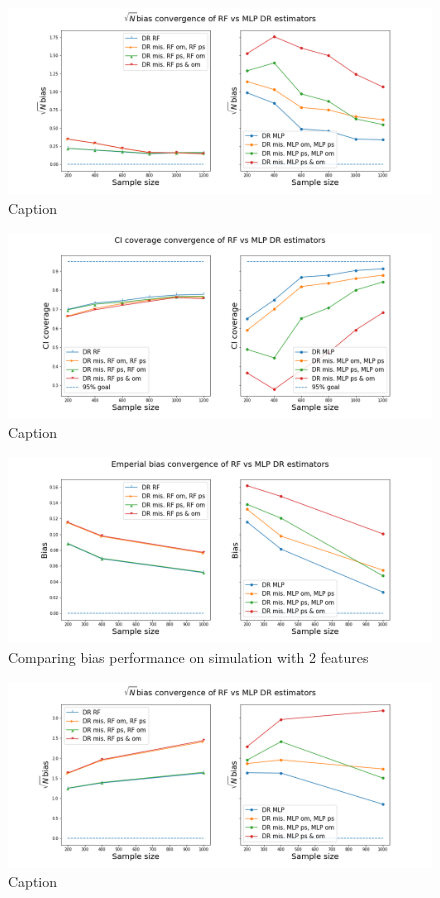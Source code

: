 \documentclass[12pt,twoside]{article}
\begin{document}
\begin{figure}[h!]
    \centering
    \includegraphics[width = 0.9\columnwidth]{figures/sqrtncompare.png}
    \caption{Caption}
    \label{fig:my_label}
\end{figure}

\begin{figure}[h!]
    \centering
    \includegraphics[width = 0.9\columnwidth]{figures/CIcompare.png}
    \caption{Caption}
    \label{fig:my_label}
\end{figure}

\begin{figure}[h!]
    \centering
    \includegraphics[width = 0.9\columnwidth]{figures/biascompare_moreW.png}
    \caption{Comparing bias performance on simulation with 2 features}
    \label{fig:my_label}
\end{figure}

\begin{figure}[h!]
    \centering
    \includegraphics[width = 0.9\columnwidth]{figures/sqrtncompare_moreW.png}
    \caption{Caption}
    \label{fig:my_label}
\end{figure}
\end{document}
